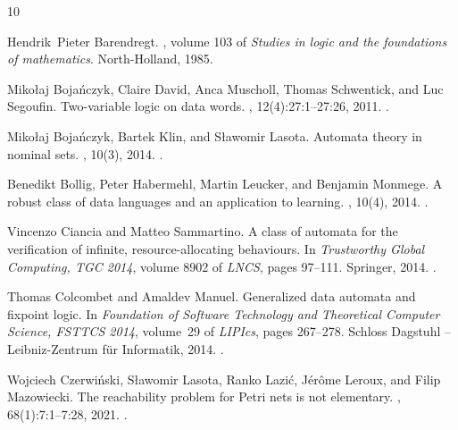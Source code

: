 \documentclass[10pt,a4paper]{amsart}
\numberwithin{equation}{section}
\newcommand{\+}[1]{\mathcal{#1}\xspace}
\theoremstyle{definition}
\begin{document}
\providecommand{\noopsort}[1]{}
\begin{thebibliography}{10}

Hendrik~Pieter Barendregt.
, volume 103 of
  {\em Studies in logic and the foundations of mathematics}.
\newblock North-Holland, 1985.

Miko{\l}aj Boja{\'n}czyk, Claire David, Anca Muscholl, Thomas Schwentick, and
  Luc Segoufin.
\newblock Two-variable logic on data words.
, 12(4):27:1--27:26, 2011.
\newblock \href {http://dx.doi.org/10.1145/1970398.1970403}
  {}.

Miko{\l}aj Boja{\'n}czyk, Bartek Klin, and S{\l}awomir Lasota.
\newblock Automata theory in nominal sets.
, 10(3), 2014.
\newblock \href {http://dx.doi.org/10.2168/LMCS-10(3:4)2014}
  {}.

Benedikt Bollig, Peter Habermehl, Martin Leucker, and Benjamin Monmege.
\newblock A robust class of data languages and an application to learning.
, 10(4), 2014.
\newblock \href {http://dx.doi.org/10.2168/LMCS-10(4:19)2014}
  {}.

Vincenzo Ciancia and Matteo Sammartino.
\newblock A class of automata for the verification of infinite,
  resource-allocating behaviours.
\newblock In {\em Trustworthy Global Computing, {TGC} 2014}, volume 8902 of
  {\em LNCS}, pages 97--111. Springer, 2014.
\newblock \href {http://dx.doi.org/10.1007/978-3-662-45917-1_7}
  {}.

Thomas Colcombet and Amaldev Manuel.
\newblock Generalized data automata and fixpoint logic.
\newblock In {\em Foundation of Software Technology and Theoretical Computer
  Science, {FSTTCS} 2014}, volume~29 of {\em LIPIcs}, pages 267--278. Schloss
  Dagstuhl -- Leibniz-Zentrum f{\"{u}}r Informatik, 2014.
\newblock \href {http://dx.doi.org/10.4230/LIPIcs.FSTTCS.2014.267}
  {}.

Wojciech Czerwi{\'n}ski, S{\l}awomir Lasota, Ranko Lazi{\'c},
  J{\'{e}}r{\^{o}}me Leroux, and Filip Mazowiecki.
\newblock The reachability problem for {P}etri nets is not elementary.
, 68(1):7:1--7:28, 2021.
\newblock \href {http://dx.doi.org/10.1145/3422822}
  {}.


\end{thebibliography}
\end{document}

